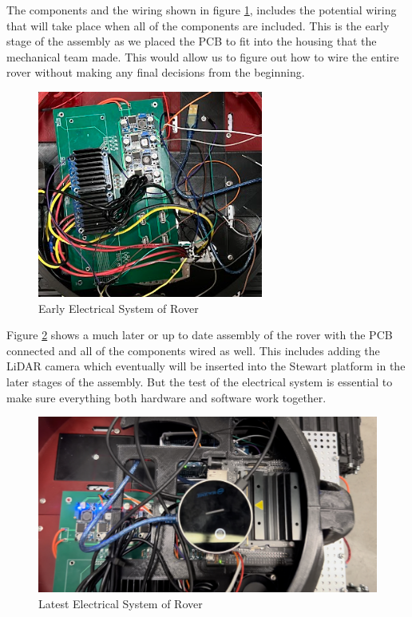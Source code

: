 \documentclass[a4paper, 10pt]{article}
\begin{document}
		The components and the wiring shown in figure \ref{early_electrical_rover}, includes the potential wiring that will take place when all of the components are included. This is the early stage of the assembly as we placed the PCB to fit into the housing that the mechanical team made. This would allow us to figure out how to wire the entire rover without making any final decisions from the beginning.
 
 		\begin{figure} [!h]
			\centering
			\includegraphics[scale=1.25]{Photos/Rover PCB (Wired)}
			\caption{Early Electrical System of Rover}
			\label{early_electrical_rover}
		\end{figure}

		Figure \ref{latest_electrical} shows a much later or up to date assembly of the rover with the PCB connected and all of the components wired as well. This includes adding the LiDAR camera which eventually will be inserted into the Stewart platform in the later stages of the assembly. But the test of the electrical system is essential to make sure everything both hardware and software work together.

		\begin{figure} [!h]
			\centering
			\includegraphics[scale=0.25]{Photos/Rover PCB (Assembled)}
			\caption{Latest Electrical System of Rover}
			\label{latest_electrical}
		\end{figure}
 		
\end{document}
